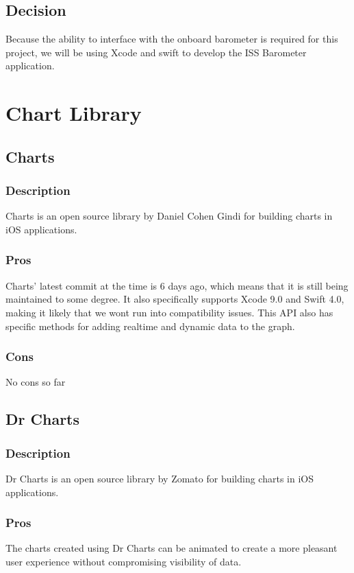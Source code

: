 \documentclass[onecolumn, draftclsnofoot,10pt, compsoc]{IEEEtran}
\begin{document}
\subsection{Decision}
Because the ability to interface with the onboard barometer is required for this project, we will be using Xcode and swift to develop the ISS Barometer application.

\section{Chart Library}
\subsection{Charts}
\subsubsection*{Description}
Charts is an open source library by Daniel Cohen Gindi for building charts in iOS applications.

\subsubsection*{Pros}
Charts' latest commit at the time is 6 days ago, which means that it is still being maintained to some degree.
It also specifically supports Xcode 9.0 and Swift 4.0, making it likely that we wont run into compatibility issues.
This API also has specific methods for adding realtime and dynamic data to the graph.

\subsubsection*{Cons}
No cons so far

\subsection{Dr Charts}
\subsubsection*{Description}
Dr Charts is an open source library by Zomato for building charts in iOS applications.

\subsubsection*{Pros}
The charts created using Dr Charts can be animated to create a more pleasant user experience without compromising visibility of data.
\end{document}
